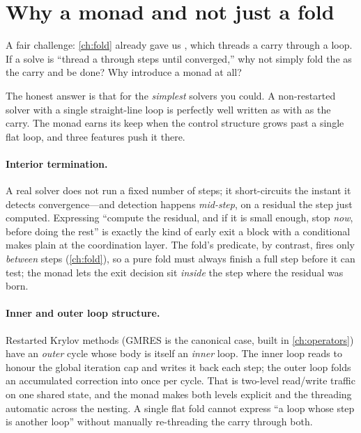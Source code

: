 \section{Why a monad and not just a fold}
\label{sec:whymonad}

A fair challenge: \cref{ch:fold} already gave us , which threads
a carry through a loop. If a solve is ``thread a  through steps until
converged,'' why not simply fold the  as the carry and be done? Why
introduce a monad at all?

The honest answer is that for the \emph{simplest} solvers you could. A non-restarted
solver with a single straight-line loop is perfectly well written as
 with  as the carry. The monad earns its keep
when the control structure grows past a single flat loop, and three features push it
there.

\paragraph{Interior termination.} A real solver does not run a fixed number of steps;
it short-circuits the instant it detects convergence---and detection happens
\emph{mid-step}, on a residual the step just computed. Expressing ``compute the
residual, and if it is small enough, stop \emph{now}, before doing the rest'' is
exactly the kind of early exit a  block with a conditional makes plain at the
coordination layer. The fold's predicate, by contrast, fires only \emph{between}
steps (\cref{ch:fold}), so a pure fold must always finish a full step before it can
test; the monad lets the exit decision sit \emph{inside} the step where the residual
was born.

\paragraph{Inner and outer loop structure.} Restarted Krylov methods (GMRES is the
canonical case, built in \cref{ch:operators}) have an \emph{outer} cycle whose body is
itself an \emph{inner} loop. The inner loop reads  to honour the
global iteration cap and writes it back each step; the outer loop folds an accumulated
correction into  once per cycle. That is two-level read/write traffic
on one shared state, and the monad makes both levels explicit and the threading
automatic across the nesting. A single flat fold cannot express ``a loop whose step is
another loop'' without manually re-threading the carry through both.

